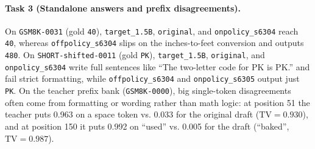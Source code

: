 \documentclass{article}
\begin{document}
\paragraph{Task 3 (Standalone answers and prefix disagreements).}
On \texttt{GSM8K-0031} (gold \texttt{40}), \texttt{target\_1.5B}, \texttt{original}, and \texttt{onpolicy\_s6304} reach \texttt{40}, whereas \texttt{offpolicy\_s6304} slips on the inches-to-feet conversion and outputs \texttt{480}. On \texttt{SHORT-shifted-0011} (gold \texttt{PK}), \texttt{target\_1.5B}, \texttt{original}, and \texttt{onpolicy\_s6304} write full sentences like ``The two-letter code for PK is PK.'' and fail strict formatting, while \texttt{offpolicy\_s6304} and \texttt{onpolicy\_s6305} output just \texttt{PK}. On the teacher prefix bank (\texttt{GSM8K-0000}), big single-token disagreements often come from formatting or wording rather than math logic: at position 51 the teacher puts 0.963 on a space token vs. 0.033 for the original draft ($\text{TV}=0.930$), and at position 150 it puts 0.992 on ``used'' vs. 0.005 for the draft (``baked'', $\text{TV}=0.987$).
\end{document}
